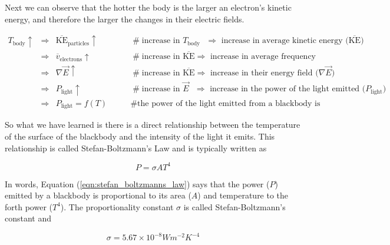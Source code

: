 \documentclass{article}
\theoremstyle{definition}
\begin{document}
\bigskip
\noindent
Next we can observe that the hotter the body is the larger an
electron's kinetic energy, and therefore the larger the changes
in their electric fields.

\begin{equation*}
\begin{array}{llll}
T_{\text{body}} \uparrow  
&\Rightarrow& \overline{\text{KE}}_{\text{particles}} \uparrow
		&\qquad \mathrel{\#} \text{increase in $T_{\text{body}}$ 
		                           $\Rightarrow$ increase in average 
		                           kinetic energy ($\overline{\text{KE}}$)} \\
[5pt]	
&\Rightarrow& \overline{v}_{\text{electrons}} \uparrow
		&\qquad \mathrel{\#} \text{increase in $\overline{\text{KE}} \Rightarrow$ increase in average frequency} \\
[5pt]
&\Rightarrow& \nabla \vec{E} \uparrow
		&\qquad \mathrel{\#} \text{increase in $\overline{\text{KE}} \Rightarrow$ increase in their energy field ($\nabla \vec{E}$)} \\
[5pt]			
&\Rightarrow& P_{\text{light}} \uparrow 
		&\qquad \mathrel{\#} \text{increase in $\vec{E}$ $\Rightarrow$ increase in the power of the light emitted ($P_{\text{light}}$)} \\
[5pt]
&\Rightarrow& P_{\text{light}} = f(T)
		&\qquad \mathrel{\#} \text{the power of the light emitted from a blackbody is a function of its temperature}
\end{array}
\end{equation*}

\noindent
So what we have learned is there is a direct relationship between
the temperature of the surface of the blackbody and the
intensity of the light it emits. This relationship is called
Stefan-Boltzmann's Law and is typically written as

\begin{equation}
P = \sigma A T^4
\label{eqn:stefan_boltzmanns_law}
\end{equation}

\bigskip
\noindent
In words, Equation (\ref{eqn:stefan_boltzmanns_law}) says that
the power ($P$) emitted by a blackbody is proportional to its
area ($A$) and temperature to the forth power ($T^4$).  The
proportionality constant $\sigma$ is called Stefan-Boltzmann's
constant and

\begin{equation*}
\sigma = 5.67 \times 10^{-8} W m^{-2} K^{-4}
\end{equation*}
\end{document}
